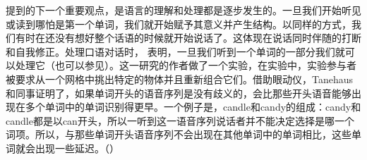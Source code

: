  \citet{SW2011a} 提到的下一个重要观点，是语言的理解和处理都是逐步发生的。一旦我们开始听见或读到哪怕是第一个单词，我们就开始赋予其意义并产生结构。以同样的方式，我们有时在还没有想好整个话语的时候就开始说话了。这体现在说话同时伴随的打断和自我修正\citep{CW98a,CFT2002a}。处理口语对话时， \citet{TSKES96a}表明，一旦我们听到一个单词的一部分我们就可以处理它（也可以参见\citealp{Marslen-Wilson75a}）。这一研究的作者做了一个实验，在实验中，实验参与者被要求从一个网格中挑出特定的物体并且重新组合它们。借助眼动仪，Tanehaus和同事证明了，如果单词开头的语音序列是没有歧义的，会比那些开头语音能够出现在多个单词中的单词识别得更早。一个例子是，candle和candy的组成：candy和candle都是以can开头，所以一听到这一语音序列说话者并不能决定选择是哪一个词项。所以，与那些单词开头语音序列不会出现在其他单词中的单词相比，这些单词就会出现一些延迟。（\citep[]{TSKES95a}）

